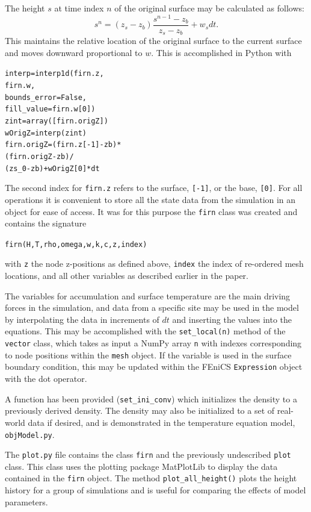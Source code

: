 \documentclass{article}%
\begin{document}
The height $s$ at time index $n$ of the original surface may be calculated as follows:
  $$s^{n} = (z_s - z_b) \frac{s^{n-1} - z_b}{z_{s} - z_b} + w_s dt.$$
This maintains the relative location of the original surface to the current surface and moves downward proportional to $w$.  This is accomplished in Python with\par
\footnotesize
\begin{alltt}
interp     = interp1d(firn.z, 
                      firn.w,
                      bounds_error=False,
                      fill_value=firn.w[0])
zint       = array([firn.origZ])
wOrigZ     = interp(zint)
firn.origZ = (firn.z[-1] - zb) * 
             (firn.origZ - zb) / 
             (zs_0 - zb) + wOrigZ[0] * dt
\end{alltt}
\normalsize
The second index for \texttt{firn.z} refers to the surface, \texttt{[-1]}, or the base, \texttt{[0]}.
For all operations it is convenient to store all the state data from the simulation in an object for ease of access.  It was for this purpose the \texttt{firn} class was created and contains the signature\par 
\footnotesize
\begin{alltt}
firn(H, T, rho, omega, w, k, c, z, index)
\end{alltt}
\normalsize
with \texttt{z} the node z-positions as defined above, \texttt{index} the index of re-ordered mesh locations, and all other variables as described earlier in the paper.

The variables for accumulation and surface temperature are the main driving forces in the simulation, and data from a specific site may be used in the model by interpolating the data in increments of $dt$ and inserting the values into the equations.  This may be accomplished with the \texttt{set\_local(n)} method of the \texttt{vector} class, which takes as input a NumPy array \texttt{n} with indexes corresponding to node positions within the \texttt{mesh} object.  If the variable is used in the surface boundary condition, this may be updated within the FEniCS \texttt{Expression} object with the dot operator.

A function has been provided (\texttt{set\_ini\_conv}) which initializes the density to a previously derived density.  The density may also be initialized to a set of real-world data if desired, and is demonstrated in the temperature equation model, \texttt{objModel.py}.

The \texttt{plot.py} file contains the class \texttt{firn} and the previously undescribed \texttt{plot} class.  This class uses the plotting package MatPlotLib to display the data contained in the \texttt{firn} object.  The method \texttt{plot\_all\_height()} plots the height history for a group of simulations and is useful for comparing the effects of model parameters. 
\end{document}
